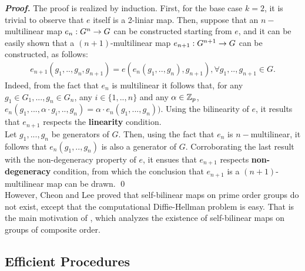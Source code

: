 \textbf{\textit{Proof.}} The proof is realized by induction. First, for the base case $k = 2$, it is trivial to observe that $e$ itself is a 2-liniar map. Then, suppose that an $n-$multilinear map $e_n:G^n\rightarrow G$ can be constructed starting from $e$, and it can be easily shown that a $(n+1)$-multilinear map $e_{n+1}:G^{n+1}\rightarrow G$ can be constructed, as follows:
\begin{align*}
	e_{n+1}(g_1,..,g_n, g_{n+1}) = e(e_n(g_1,.., g_n), g_{n+1}), \forall g_1, .., g_{n+1} \in G.
\end{align*}
Indeed, from the fact that $e_n$ is multilinear it follows that, for any $g_1\in G_1, ..., g_n \in G_n$, any $i\in \{1,..,n\}$ and any $\alpha \in {\mathbb Z}_p$,  $e_n(g_1,...,\alpha \cdot g_i, ..,g_n) = \alpha \cdot e_n(g_1,...,g_n))$. Using the bilinearity of $e$, it results that $e_{n+1}$ respects the \textbf{linearity} condition.\\
Let $g_1, ...,g_n$ be generators of $G$. Then, using the fact that $e_{n}$ is $n-$multilinear, it follows that $e_n(g_1,..,g_n)$ is also a generator of $G$. Corroborating the last result with the non-degeneracy property of $e$, it ensues that $e_{n+1}$ respects \textbf{non-degeneracy} condition, from which the conclusion that $e_{n+1}$ is a $(n+1)$-multilinear map can be drawn. \qed\\

However, Cheon and Lee \cite{ChL09} proved that self-bilinear maps on prime order groups do not exist, except that the computational Diffie-Hellman problem is easy. That is the main motivation of \cite{BCM16}, which analyzes the existence of self-bilinear maps on groups of composite order.

\subsection{Efficient Procedures}

